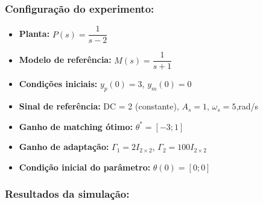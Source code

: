 \documentclass[10pt]{article}
\begin{document}
\subsubsection{Configuração do experimento:}
\begin{itemize}
\item \textbf{Planta:} $P(s) = \dfrac{1}{s - 2}$
\item \textbf{Modelo de referência:} $M(s) = \dfrac{1}{s + 1}$
\item \textbf{Condições iniciais:} $y_p(0)=3$, $y_m(0)=0$
\item \textbf{Sinal de referência:} DC = 2 (constante), $A_s=1$, $\omega_s=5$,rad/s
\item \textbf{Ganho de matching ótimo:} $\theta^* = [-3;1]$
\item \textbf{Ganho de adaptação:} $\Gamma_1 = 2I_{2\times2}$, $\Gamma_2 = 100 I_{2\times2}$
\item \textbf{Condição inicial do parâmetro:} $\theta(0) = [0;0]$
\end{itemize}

\subsubsection{Resultados da simulação:}
\end{document}
